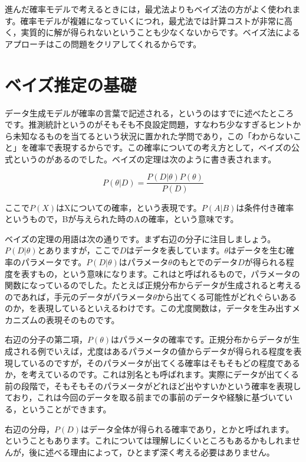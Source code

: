 \documentclass{ltjsbook}
\begin{document}
進んだ確率モデルで考えるときには，最尤法よりもベイズ法の方がよく使われます。確率モデルが複雑になっていくにつれ，最尤法では計算コストが非常に高く，実質的に解が得られないということも少なくないからです。ベイズ法によるアプローチはこの問題をクリアしてくれるからです。

\section{ベイズ推定の基礎}

データ生成モデルが確率の言葉で記述される，というのはすでに述べたところです。推測統計というのがそもそも不良設定問題，すなわち少なすぎるヒントから未知なるものを当てるという状況に置かれた学問であり，この「わからないこと」を確率で表現するからです。この確率についての考え方として，ベイズの公式というのがあるのでした。ベイズの定理は次のように書き表されます。

$$ P(\theta|D) = \frac{P(D|\theta)P(\theta)}{P(D)} $$

ここで$P(X)$はXについての確率，という表現です。$P(A|B)$は条件付き確率というもので，Bが与えられた時のAの確率，という意味です。

ベイズの定理の用語は次の通りです。まず右辺の分子に注目しましょう。$P(D|\theta)$とありますが，ここで$D$はデータを表しています。$\theta$はデータを生む確率のパラメータです。$P(D|\theta)$はパラメータ$\theta$のもとでのデータ$D$が得られる程度を表すもの，という意味になります。これはと呼ばれるもので，パラメータの関数になっているのでした。たとえば正規分布からデータが生成されると考えるのであれば，手元のデータがパラメータ$\theta$から出てくる可能性がどれぐらいあるのか，を表現しているといえるわけです。この尤度関数は，データを生み出すメカニズムの表現そのものです。

右辺の分子の第二項，$P(\theta)$はパラメータの確率です。正規分布からデータが生成される例でいえば，尤度はあるパラメータの値からデータが得られる程度を表現しているのですが，そのパラメータが出てくる確率はそもそもどの程度であるか，を考えているのです。これは別名とも呼ばれます。実際にデータが出てくる前の段階で，そもそもそのパラメータがどれほど出やすいかという確率を表現しており，これは今回のデータを取る前までの事前のデータや経験に基づいている，ということができます。

右辺の分母，$P(D)$はデータ全体が得られる確率であり，とかと呼ばれます。ということもあります。これについては理解しにくいところもあるかもしれませんが，後に述べる理由によって，ひとまず深く考える必要はありません。
\end{document}
